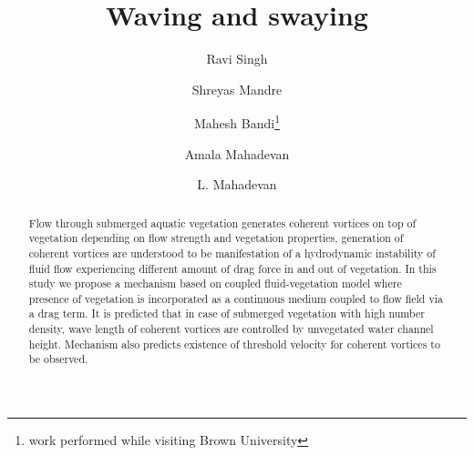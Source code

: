 \documentclass[aps,preprint,floatfix,prl]{revtex4-1}
\begin{document}
\title{Waving and swaying}
\author{Ravi Singh}
\author{Shreyas Mandre}
\author{Mahesh Bandi\footnote{work performed while visiting Brown University}}
\author{Amala Mahadevan}
\author{L. Mahadevan}

\begin{abstract}

Flow through submerged aquatic vegetation generates coherent vortices on top of vegetation depending on flow strength and vegetation 
properties, generation of coherent vortices are understood to be manifestation of a hydrodynamic instability of fluid flow experiencing 
different amount of drag force in and out of vegetation. In this study we propose a mechanism based on coupled fluid-vegetation model where presence of vegetation is incorporated 
as a continuous medium coupled to flow field via a drag term. It is predicted that in case of submerged vegetation with high number density,
wave length of coherent vortices are %
controlled by unvegetated water channel height. Mechanism also predicts existence of threshold velocity for coherent vortices to be observed.     
\end{abstract}
\maketitle
\end{document}
